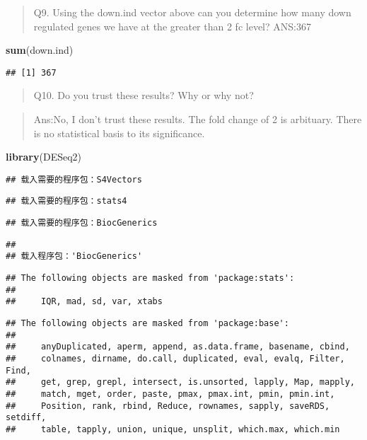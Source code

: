\documentclass[
]{article}
\newenvironment{Shaded}{\begin{snugshade}}{\end{snugshade}}
\newcommand{\FunctionTok}[1]{\textcolor[rgb]{0.13,0.29,0.53}{\textbf{#1}}}
\newcommand{\NormalTok}[1]{#1}
\begin{document}
\begin{quote}
Q9. Using the down.ind vector above can you determine how many down
regulated genes we have at the greater than 2 fc level? ANS:367
\end{quote}

\begin{Shaded}
\begin{Highlighting}[]
\FunctionTok{sum}\NormalTok{(down.ind)}
\end{Highlighting}
\end{Shaded}

\begin{verbatim}
## [1] 367
\end{verbatim}

\begin{quote}
Q10. Do you trust these results? Why or why not?
\end{quote}

\begin{quote}
Ans:No, I don't trust these results. The fold change of 2 is arbituary.
There is no statistical basis to its significance.
\end{quote}

\begin{Shaded}
\begin{Highlighting}[]
\FunctionTok{library}\NormalTok{(DESeq2)}
\end{Highlighting}
\end{Shaded}

\begin{verbatim}
## 载入需要的程序包：S4Vectors
\end{verbatim}

\begin{verbatim}
## 载入需要的程序包：stats4
\end{verbatim}

\begin{verbatim}
## 载入需要的程序包：BiocGenerics
\end{verbatim}

\begin{verbatim}
## 
## 载入程序包：'BiocGenerics'
\end{verbatim}

\begin{verbatim}
## The following objects are masked from 'package:stats':
## 
##     IQR, mad, sd, var, xtabs
\end{verbatim}

\begin{verbatim}
## The following objects are masked from 'package:base':
## 
##     anyDuplicated, aperm, append, as.data.frame, basename, cbind,
##     colnames, dirname, do.call, duplicated, eval, evalq, Filter, Find,
##     get, grep, grepl, intersect, is.unsorted, lapply, Map, mapply,
##     match, mget, order, paste, pmax, pmax.int, pmin, pmin.int,
##     Position, rank, rbind, Reduce, rownames, sapply, saveRDS, setdiff,
##     table, tapply, union, unique, unsplit, which.max, which.min
\end{verbatim}
\end{document}

